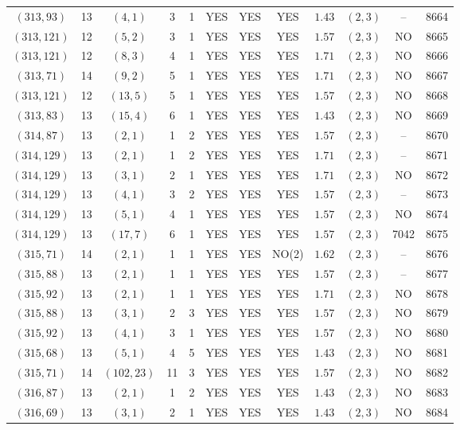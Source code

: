 \begin{longtable}{|c|c|c|c|c|c|c|c|c|c|c|c|}
$(313,93)$ & 13 & $(4,1)$ & 3 & 1 & YES & YES & YES & $1.43$ & $(2,3)$ & -- & 8664\\
$(313,121)$ & 12 & $(5,2)$ & 3 & 1 & YES & YES & YES & $1.57$ & $(2,3)$ & NO & 8665\\
$(313,121)$ & 12 & $(8,3)$ & 4 & 1 & YES & YES & YES & $1.71$ & $(2,3)$ & NO & 8666\\
$(313,71)$ & 14 & $(9,2)$ & 5 & 1 & YES & YES & YES & $1.71$ & $(2,3)$ & NO & 8667\\
$(313,121)$ & 12 & $(13,5)$ & 5 & 1 & YES & YES & YES & $1.57$ & $(2,3)$ & NO & 8668\\
$(313,83)$ & 13 & $(15,4)$ & 6 & 1 & YES & YES & YES & $1.43$ & $(2,3)$ & NO & 8669\\
$(314,87)$ & 13 & $(2,1)$ & 1 & 2 & YES & YES & YES & $1.57$ & $(2,3)$ & -- & 8670\\
$(314,129)$ & 13 & $(2,1)$ & 1 & 2 & YES & YES & YES & $1.71$ & $(2,3)$ & -- & 8671\\
$(314,129)$ & 13 & $(3,1)$ & 2 & 1 & YES & YES & YES & $1.71$ & $(2,3)$ & NO & 8672\\
$(314,129)$ & 13 & $(4,1)$ & 3 & 2 & YES & YES & YES & $1.57$ & $(2,3)$ & -- & 8673\\
$(314,129)$ & 13 & $(5,1)$ & 4 & 1 & YES & YES & YES & $1.57$ & $(2,3)$ & NO & 8674\\
$(314,129)$ & 13 & $(17,7)$ & 6 & 1 & YES & YES & YES & $1.57$ & $(2,3)$ & 7042 & 8675\\
$(315,71)$ & 14 & $(2,1)$ & 1 & 1 & YES & YES & NO(2) & $1.62$ & $(2,3)$ & -- & 8676\\
$(315,88)$ & 13 & $(2,1)$ & 1 & 1 & YES & YES & YES & $1.57$ & $(2,3)$ & -- & 8677\\
$(315,92)$ & 13 & $(2,1)$ & 1 & 1 & YES & YES & YES & $1.71$ & $(2,3)$ & NO & 8678\\
$(315,88)$ & 13 & $(3,1)$ & 2 & 3 & YES & YES & YES & $1.57$ & $(2,3)$ & NO & 8679\\
$(315,92)$ & 13 & $(4,1)$ & 3 & 1 & YES & YES & YES & $1.57$ & $(2,3)$ & NO & 8680\\
$(315,68)$ & 13 & $(5,1)$ & 4 & 5 & YES & YES & YES & $1.43$ & $(2,3)$ & NO & 8681\\
$(315,71)$ & 14 & $(102,23)$ & 11 & 3 & YES & YES & YES & $1.57$ & $(2,3)$ & NO & 8682\\
$(316,87)$ & 13 & $(2,1)$ & 1 & 2 & YES & YES & YES & $1.43$ & $(2,3)$ & NO & 8683\\
$(316,69)$ & 13 & $(3,1)$ & 2 & 1 & YES & YES & YES & $1.43$ & $(2,3)$ & NO & 8684\\

\end{longtable}
